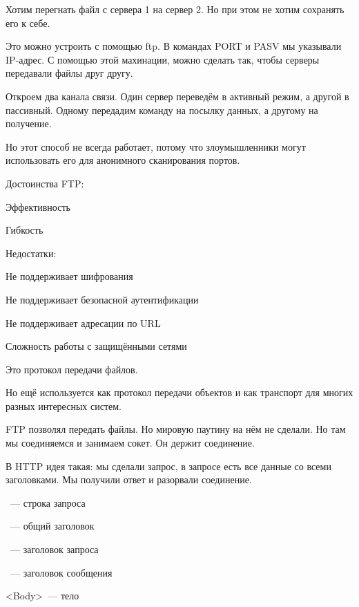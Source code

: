 Хотим перегнать файл с сервера 1 на сервер 2. Но при этом не хотим сохранять его к себе. 

Это можно устроить с помощью ftp. В командах PORT и PASV мы указывали IP-адрес. С помощью этой махинации, можно сделать так, чтобы серверы передавали файлы друг другу.

Откроем два канала связи. Один сервер переведём в активный режим, а другой в пассивный. Одному передадим команду на посылку данных, а другому на получение.

Но этот способ не всегда работает, потому что злоумышленники могут использовать его для анонимного сканирования портов.

Достоинства FTP:
\begin{MyItemize}
    \item Эффективность
    \item Гибкость
\end{MyItemize}

Недостатки:
\begin{MyItemize}
    \item Не поддерживает шифрования
    \item Не поддерживает безопасной аутентификации
    \item Не поддерживает адресации по URL
    \item Сложность работы с защищёнными сетями
\end{MyItemize}


Это протокол передачи файлов.

Но ещё используется как протокол передачи объектов и как транспорт для многих разных интересных систем.

FTP позволял передать файлы. Но мировую паутину на нём не сделали. Но там мы соединяемся и занимаем сокет. Он держит соединение. 

В HTTP идея такая: мы сделали запрос, в запросе есть все данные со всеми заголовками. Мы получили ответ и разорвали соединение.

\begin{MyItemize}
    \item <Request-line>~--- строка запроса
    \item <General-header>~--- общий заголовок
    \item <Request-header>~--- заголовок запроса
    \item <Entity-header>~--- заголовок сообщения
    \item <Body>~--- тело
\end{MyItemize}

